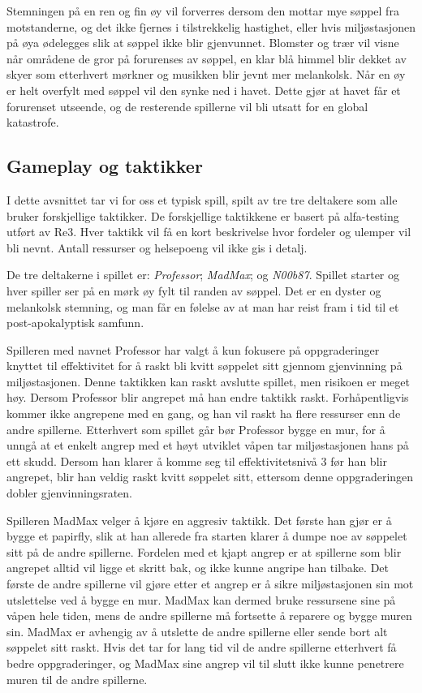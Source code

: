 Stemningen på en ren og fin øy vil forverres dersom den mottar mye søppel fra motstanderne, og det ikke fjernes i tilstrekkelig hastighet,
eller hvis miljøstasjonen på øya ødelegges slik at søppel ikke blir gjenvunnet.
Blomster og trær vil visne når områdene de gror på forurenses av søppel, en klar blå himmel blir dekket av skyer som etterhvert mørkner og
musikken blir jevnt mer melankolsk. 
Når en øy er helt overfylt med søppel vil den synke ned i havet. Dette gjør at havet får et forurenset utseende, og de resterende spillerne vil bli utsatt for en global katastrofe. %


\subsection{Gameplay og taktikker}

I dette avsnittet tar vi for oss et typisk spill, spilt av tre tre deltakere som alle bruker forskjellige taktikker. De forskjellige taktikkene er basert på alfa-testing utført av Re3. Hver taktikk vil få en kort beskrivelse hvor fordeler og ulemper vil bli nevnt. Antall ressurser og helsepoeng vil ikke gis i detalj.

De tre deltakerne i spillet er: \emph{Professor}; \emph{MadMax}; og \emph{N00b87}. Spillet starter og hver spiller ser på en mørk øy fylt til randen av søppel. Det er en dyster og melankolsk stemning, og man får en følelse av at man har reist fram i tid til et post-apokalyptisk samfunn.

Spilleren med navnet Professor har valgt å kun fokusere på oppgraderinger knyttet til effektivitet for å raskt bli kvitt søppelet sitt gjennom gjenvinning på miljøstasjonen. Denne taktikken kan raskt avslutte spillet, men risikoen er meget høy. Dersom Professor blir angrepet må han endre taktikk raskt. Forhåpentligvis kommer ikke angrepene med en gang, og han vil raskt ha flere ressurser enn de andre spillerne. Etterhvert som spillet går bør Professor bygge en mur, for å unngå at et enkelt angrep med et høyt utviklet våpen tar miljøstasjonen hans på ett skudd. Dersom han klarer å komme seg til effektivitetsnivå 3 før han blir angrepet, blir han veldig raskt kvitt søppelet sitt, ettersom denne oppgraderingen dobler gjenvinningsraten. 

Spilleren MadMax velger å kjøre en aggresiv taktikk. Det første han gjør er å bygge et papirfly, slik at han allerede fra starten klarer å dumpe noe av søppelet sitt på de andre spillerne. Fordelen med et kjapt angrep er at spillerne som blir angrepet alltid vil ligge et skritt bak, og ikke kunne angripe han tilbake. Det første de andre spillerne vil gjøre etter et angrep er å sikre miljøstasjonen sin mot utslettelse ved å bygge en mur. MadMax kan dermed bruke ressursene sine på våpen hele tiden, mens de andre spillerne må fortsette å reparere og bygge muren sin. MadMax er avhengig av å utslette de andre spillerne eller sende bort alt søppelet sitt raskt. Hvis det tar for lang tid vil de andre spillerne etterhvert få bedre oppgraderinger, og MadMax sine angrep vil til slutt ikke kunne penetrere muren til de andre spillerne.

